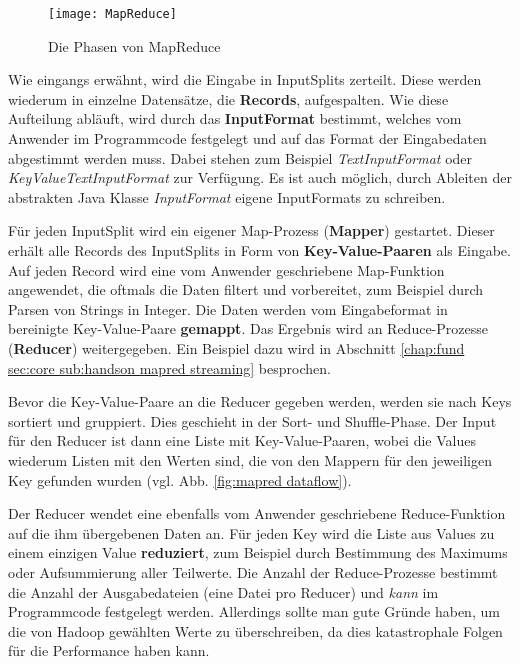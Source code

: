 \begin{figure}[ht]
    \centering
    \texttt{[image: MapReduce]}
    \caption[Die Phasen von MapReduce]{Die Phasen von MapReduce\parencite[Seite 34, Figure 2-4]{white_hadoop_2015}}
    \label{fig:mapred}
\end{figure}
Wie eingangs erwähnt, wird die Eingabe in InputSplits zerteilt. Diese werden wiederum in einzelne Datensätze, die \textbf{Records}, aufgespalten. Wie diese Aufteilung abläuft, wird durch das \textbf{InputFormat} bestimmt, welches vom Anwender im Programmcode festgelegt und auf das Format der Eingabedaten abgestimmt werden muss. Dabei stehen zum Beispiel \textit{TextInputFormat} oder \textit{KeyValueTextInputFormat} zur Verfügung. Es ist auch möglich, durch Ableiten der abstrakten Java Klasse \textit{InputFormat} eigene InputFormats zu schreiben.\cite{white_hadoop_2015}
\par
Für jeden InputSplit wird ein eigener Map-Prozess (\textbf{Mapper}) gestartet. Dieser erhält alle Records des InputSplits in Form von \textbf{Key-Value-Paaren} als Eingabe. Auf jeden Record wird eine vom Anwender geschriebene Map-Funktion angewendet, die oftmals die Daten filtert und vorbereitet, zum Beispiel durch Parsen von Strings in Integer. Die Daten werden vom Eingabeformat in bereinigte Key-Value-Paare \textbf{gemappt}. Das Ergebnis wird an Reduce-Prozesse (\textbf{Reducer}) weitergegeben. Ein Beispiel dazu wird in Abschnitt \ref{chap:fund sec:core sub:handson mapred streaming} besprochen.
\par
Bevor die Key-Value-Paare an die Reducer gegeben werden, werden sie nach Keys sortiert und gruppiert. Dies geschieht in der Sort- und Shuffle-Phase. Der Input für den Reducer ist dann eine Liste mit Key-Value-Paaren, wobei die Values wiederum Listen mit den Werten sind, die von den Mappern für den jeweiligen Key gefunden wurden (vgl. Abb. \ref{fig:mapred dataflow}). 
\par
Der Reducer wendet eine ebenfalls vom Anwender geschriebene Reduce-Funktion auf die ihm übergebenen Daten an. Für jeden Key wird die Liste aus Values zu einem einzigen Value \textbf{reduziert}, zum Beispiel durch Bestimmung des Maximums oder Aufsummierung aller Teilwerte. Die Anzahl der Reduce-Prozesse bestimmt die Anzahl der Ausgabedateien (eine Datei pro Reducer) und \textit{kann} im Programmcode festgelegt werden. Allerdings sollte man gute Gründe haben, um die von Hadoop gewählten Werte zu überschreiben, da dies katastrophale Folgen für die Performance haben kann.\cite{infrabot_howmanymapsandreduces_2019} 

